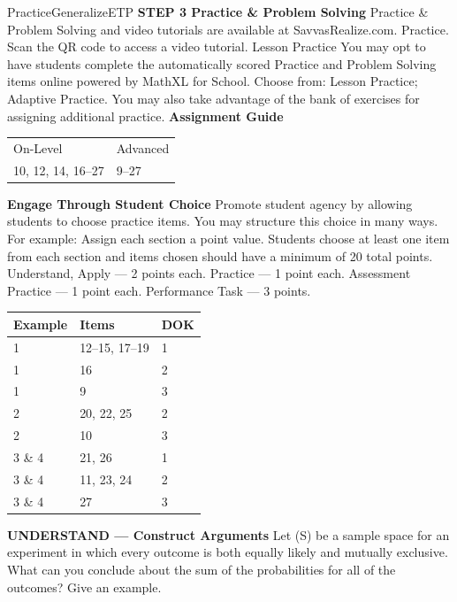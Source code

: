 \documentclass{article}
\newenvironment{item-analysis}{}{}      %
\newenvironment{practice}[2]{}{}        %
\newenvironment{te-addendum}[2]{}{}     %
\newcommand{\answer}[1]{}               %
\newcommand{\te}[1]{}                   %
\begin{document}
\begin{te-addendum}{Practice}{GeneralizeETP}
\textbf{STEP 3 Practice & Problem Solving}
Practice & Problem Solving and video tutorials are available at SavvasRealize.com. Practice. Scan the QR code to access a video tutorial.
Lesson Practice You may opt to have students complete the automatically scored Practice and Problem Solving items online powered by MathXL for School.
Choose from: Lesson Practice; Adaptive Practice.
You may also take advantage of the bank of exercises for assigning additional practice.
\textbf{Assignment Guide}
\begin{tabular}{ll}
On-Level & Advanced \\
10, 12, 14, 16--27 & 9--27 \\
\end{tabular}
\textbf{Engage Through Student Choice}
Promote student agency by allowing students to choose practice items. You may structure this choice in many ways.
For example:
Assign each section a point value. Students choose at least one item from each section and items chosen should have a minimum of 20 total points.
Understand, Apply — 2 points each.
Practice — 1 point each.
Assessment Practice — 1 point each.
Performance Task — 3 points.
\end{te-addendum}
\begin{item-analysis}
\begin{tabular}{lll}
\toprule
Example & Items & DOK \\
\midrule
1 & 12--15, 17--19 & 1 \\
1 & 16 & 2 \\
1 & 9 & 3 \\
2 & 20, 22, 25 & 2 \\
2 & 10 & 3 \\
3 \& 4 & 21, 26 & 1 \\
3 \& 4 & 11, 23, 24 & 2 \\
3 \& 4 & 27 & 3 \\
\bottomrule
\end{tabular}
\te{Printed combined example cell 3 and 4. The checker does not parse this combined label; the six corresponding practice DOK values are copied from these rows.}
\end{item-analysis}
\begin{practice}{9}{3}
\textbf{UNDERSTAND — Construct Arguments} Let (S) be a sample space for an experiment in which every outcome is both equally likely and mutually exclusive. What can you conclude about the sum of the probabilities for all of the outcomes? Give an example.
\answer{Sample: One situation in which every outcome is equally likely and every outcome is mutually exclusive is rolling a standard number cube. If you add the probabilities for getting each side of a number cube, 1, 2, 3, 4, 5, or 6, the sum is (\frac16+\frac16+\frac16+\frac16+\frac16+\frac16=\frac66=1). So, if you add all of the probabilities in an experiment where every outcome is both equally likely and mutually exclusive, the sum of the probabilities should be 1.}
\end{practice}
\end{document}
